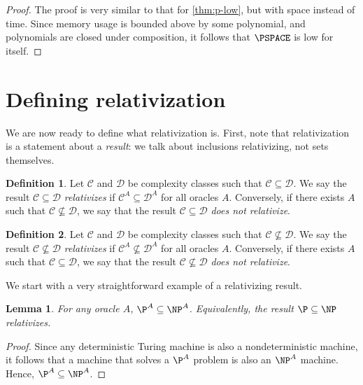 \documentclass[english,12pt]{reedthesis}
\theoremstyle{plain}
\newtheorem{lemma}[lemma]{Lemma}
\theoremstyle{definition}
\newtheorem{defn}[defn]{Definition}
\theoremstyle{remark}
\begin{document}
\begin{proof}
  The proof is very similar to that for \cref{thm:p-low}, but with space instead
  of time. Since memory usage is bounded above by some polynomial, and
  polynomials are closed under composition, it follows that $\PSPACE$ is low for
  itself.
\end{proof}

\section{Defining relativization}

We are now ready to define what relativization is. First, note that
relativization is a statement about a \emph{result}: we talk about inclusions
relativizing, not sets themselves.

\begin{defn}\label{def:relativization}
  Let $\mathcal{C}$ and $\mathcal{D}$ be complexity classes such that $\mathcal{C} \subseteq \mathcal{D}$. We say the result
  $\mathcal{C} \subseteq \mathcal{D}$ \emph{relativizes} if $\mathcal{C}^{A} \subseteq \mathcal{D}^{A}$ for all oracles $A$. Conversely,
  if there exists $A$ such that $\mathcal{C} \nsubseteq \mathcal{D}$, we say that the result $\mathcal{C} \subseteq \mathcal{D}$
  \emph{does not relativize}.
\end{defn}

\begin{defn}\label{def:relativization-ne}
  Let $\mathcal{C}$ and $\mathcal{D}$ be complexity classes such that $\mathcal{C} \nsubseteq \mathcal{D}$. We say the result
  $\mathcal{C} \nsubseteq \mathcal{D}$ \emph{relativizes} if $\mathcal{C}^{A} \nsubseteq \mathcal{D}^{A}$ for all oracles $A$. Conversely,
  if there exists $A$ such that $\mathcal{C} \subseteq \mathcal{D}$, we say that the result $\mathcal{C} \nsubseteq \mathcal{D}$
  \emph{does not relativize}.
\end{defn}

We start with a very straightforward example of a relativizing result.

\begin{lemma}\label{lem:pa-subset-npa}
  For any oracle $A$, $\P^{A} \subseteq \NP^{A}$. Equivalently, the result $\P \subseteq \NP$
  relativizes.
\end{lemma}

\begin{proof}
  Since any deterministic Turing machine is also a nondeterministic machine, it
  follows that a machine that solves a $\P^{A}$ problem is also an $\NP^{A}$
  machine. Hence, $\P^{A} \subseteq \NP^{A}$.
\end{proof}
\end{document}
